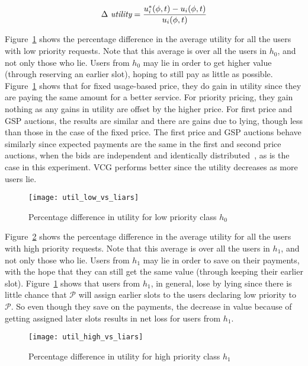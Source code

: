 \begin{equation}
	\Delta \ \textrm{\itshape utility} = \frac{
						u^*_i(\phi,t) - 
						u_i(\phi,t)
					}{
						u_i(\phi,t)
					}
\end{equation}


Figure~\ref{fig__util_low_vs_liars} shows the percentage difference in the average utility for all the users with low priority requests.
Note that this average is over all the users in $h_0$, and not only those who lie.
Users from $h_0$ may lie in order to get higher value (through reserving an earlier slot),
hoping to still pay as little as possible. 
Figure~\ref{fig__util_low_vs_liars} shows that for fixed usage-based price, they do gain in utility since they are paying the same amount for a better service.
For priority pricing, they gain nothing as any gains in utility are offset by the higher price.
For first price and GSP auctions, the results are similar and there are gains due to lying, though less than those in the case of the fixed price.
The first price and GSP auctions behave similarly since expected payments are the same in the first and second price auctions, when the bids are independent and identically distributed~\cite{Maille2014}, as is the case in this experiment. 
VCG performs better since the utility decreases as more users lie.

\begin{figure}[tbp]
	\centering
	\texttt{[image: util\_low\_vs\_liars]}
	\caption{Percentage difference in utility for low priority class $h_0$}
	\label{fig__util_low_vs_liars}
\end{figure}

Figure~\ref{fig__util_high_vs_liars} shows the percentage difference in the average utility for all the users with high priority requests.
Note that this average is over all the users in $h_1$, and not only those who lie.
Users from $h_1$ may lie in order to save on their payments, with the hope that they can still get the same value (through keeping their earlier slot). 
Figure~\ref{fig__util_low_vs_liars} shows that users from $h_1$, in general, lose by lying since there is little chance that $\mathcal{P}$ will assign earlier slots to the users declaring low priority to $\mathcal{P}$.
So even though they save on the payments, the decrease in value because of getting assigned later slots results in net loss for users from $h_1$.

\begin{figure}[tbp]
	\centering
	\texttt{[image: util\_high\_vs\_liars]}
	\caption{Percentage difference in utility for high priority class $h_1$}
	\label{fig__util_high_vs_liars}
\end{figure}

